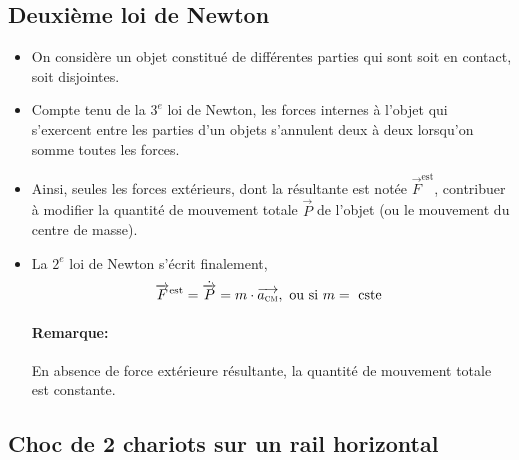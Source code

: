 \documentclass[
    11pt,
    a4paper,
    oneside,
    headinlcude, footinclude,
    twoside,
]{report}
\renewcommand{\vec}[1]{\overrightarrow{#1}}
\begin{document}
\subsection{Deuxième loi de Newton}
\label{sub:deuxieme_loi_de_newton}

\begin{itemize}
    \item On considère un objet constitué de différentes parties qui sont
        soit en contact, soit disjointes.

    \item Compte tenu de la $3^e$ loi de Newton, les forces internes à l'objet
        qui s'exercent entre les parties d'un objets s'annulent deux à deux
        lorsqu'on somme toutes les forces.

    \item Ainsi, seules les forces extérieurs, dont la résultante est notée $\vec F^{\text{est}}$,
        contribuer à modifier la quantité de mouvement totale $\vec P$ de
        l'objet (ou le mouvement du centre de masse).
    \item La $2^e$ loi de Newton s'écrit finalement,
        \begin{equation}
            \vec F^{\text{est}} = \dot{\vec P} = m \cdot \vec{a_{\textsc{cm}}},
            \text{ ou si } m = \text{ cste } 
        \end{equation}

        \paragraph{Remarque:}
        
        En absence de force extérieure résultante, la quantité de mouvement
        totale est constante.
\end{itemize}


\subsection{Choc de 2 chariots sur un rail horizontal}
\label{sub:choc_de_2_chariots_sur_un_rail_horizontal}
\end{document}
